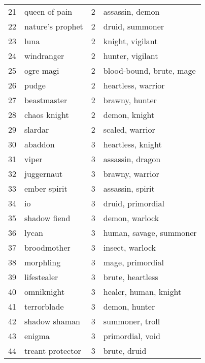 \documentclass[smallextended]{svjour3}       %
\begin{document}
\begin{table}
{\begin{tabular}{llrl}
21 &        queen of pain &      2 &                assassin, demon \\
22 &     nature's prophet &      2 &                druid, summoner \\
23 &                 luna &      2 &               knight, vigilant \\
24 &           windranger &      2 &               hunter, vigilant \\
25 &            ogre magi &      2 &       blood-bound, brute, mage \\
26 &                pudge &      2 &            heartless, warrior  \\
27 &          beastmaster &      2 &                 brawny, hunter \\
28 &         chaos knight &      2 &                  demon, knight \\
29 &              slardar &      2 &               scaled, warrior  \\
30 &              abaddon &      3 &              heartless, knight \\
31 &                viper &      3 &               assassin, dragon \\
32 &           juggernaut &      3 &               brawny, warrior  \\
33 &         ember spirit &      3 &               assassin, spirit \\
34 &                   io &      3 &              druid, primordial \\
35 &         shadow fiend &      3 &                demon, warlock  \\
36 &                lycan &      3 &        human, savage, summoner \\
37 &          broodmother &      3 &               insect, warlock  \\
38 &            morphling &      3 &               mage, primordial \\
39 &          lifestealer &      3 &               brute, heartless \\
40 &           omniknight &      3 &          healer, human, knight \\
41 &          terrorblade &      3 &                  demon, hunter \\
42 &        shadow shaman &      3 &                summoner, troll \\
43 &               enigma &      3 &               primordial, void \\
44 &     treant protector &      3 &                   brute, druid \\

\end{tabular}}
\end{table}
\end{document}

